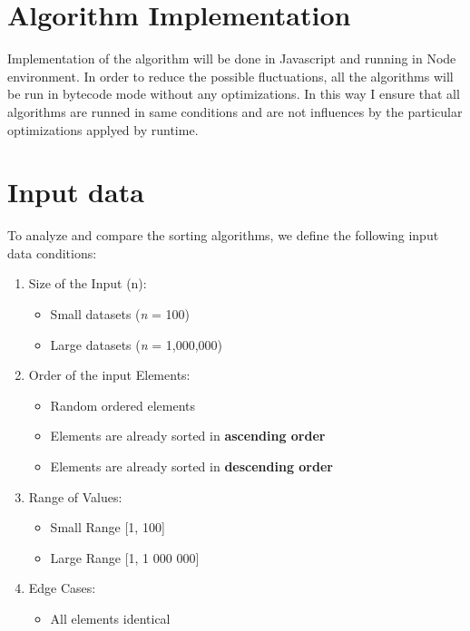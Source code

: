 \documentclass[12pt]{article}
\begin{document}
\clearpage
\section*{Algorithm Implementation}
\hspace{0.8cm}

Implementation of the algorithm will be done in Javascript and running in Node environment.
In order to reduce the possible fluctuations, all the algorithms will be run in bytecode 
mode without any optimizations. In this way I ensure that all algorithms are 
runned in same conditions and are not influences by the particular optimizations applyed by
runtime.\cite{bytecoderef}

\clearpage
\section*{Input data}
\hspace{0.8cm}
To analyze and compare the sorting algorithms, we define the following input data conditions:
\begin{enumerate}
    \item Size of the Input (n):
      \begin{itemize}
        \item Small datasets (\textit{n} = 100)  
        \item Large datasets (\textit{n} = 1,000,000)  
      \end{itemize}

    \item Order of the input Elements:
      \begin{itemize}
        \item Random ordered elements
        \item Elements are already sorted in \textbf{ascending order}
        \item Elements are already sorted in \textbf{descending order}
      \end{itemize}

    \item Range of Values:
      \begin{itemize}
        \item Small Range [1, 100]
        \item Large Range [1, 1 000 000]
      \end{itemize}

    \item Edge Cases:
      \begin{itemize}
        \item All elements identical
      \end{itemize}
\end{enumerate}
\end{document}
